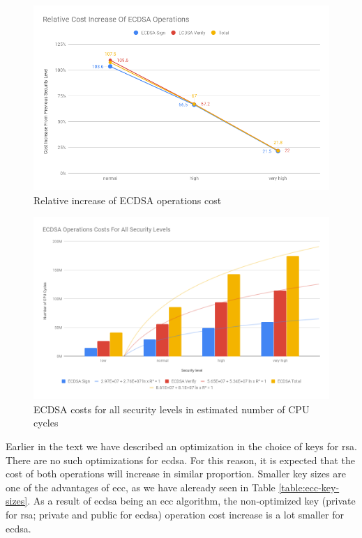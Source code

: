 \begin{figure}
  \centering
  \includegraphics[width=1.0\textwidth]{img/ecdsa_realtive_cost_increase.png}
  \centering \caption{\label{fig:ecdsa-relative-cost-incerase} Relative increase of ECDSA operations cost}
\end{figure}

\begin{figure}
  \centering
  \includegraphics[width=1.0\textwidth]{img/ecdsa_cost_all_sls.png}
  \centering \caption{\label{fig:ecdsa-costs-all-sls} ECDSA costs for all security levels in estimated number of CPU cycles}
\end{figure}

Earlier in the text we have described an optimization in the choice of keys for \gls{rsa}. There are no such optimizations
for \gls{ecdsa}. For this reason, it is expected that the cost of both operations will increase in similar proportion. 
Smaller key sizes are one of the advantages of \gls{ecc}, as we have aleready seen in Table \ref{table:ecc-key-sizes}.
As a result of \gls{ecdsa} being an \gls{ecc} algorithm, the non-optimized
key (private for \gls{rsa}; private and public for \gls{ecdsa}) operation cost increase is a lot smaller for \gls{ecdsa}.

